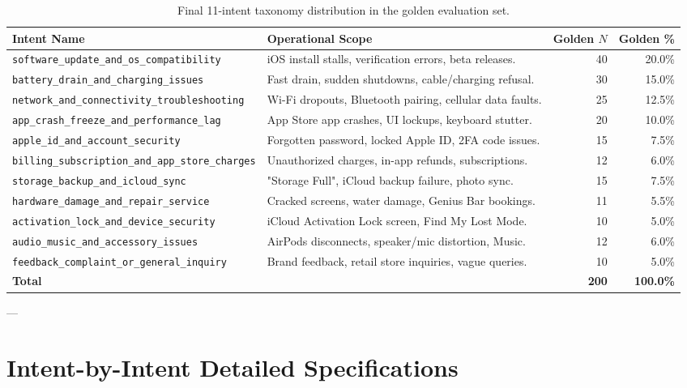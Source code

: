 \documentclass[11pt,a4paper]{article}
\begin{document}
\begin{table}[ht]
\centering
\small
\begin{tabularx}{\textwidth}{lXrr}
\toprule
\textbf{Intent Name} & \textbf{Operational Scope} & \textbf{Golden $N$} & \textbf{Golden \%} \\
\midrule
\texttt{software\_update\_and\_os\_compatibility} & iOS install stalls, verification errors, beta releases. & 40 & 20.0\% \\
\texttt{battery\_drain\_and\_charging\_issues} & Fast drain, sudden shutdowns, cable/charging refusal. & 30 & 15.0\% \\
\texttt{network\_and\_connectivity\_troubleshooting} & Wi-Fi dropouts, Bluetooth pairing, cellular data faults. & 25 & 12.5\% \\
\texttt{app\_crash\_freeze\_and\_performance\_lag} & App Store app crashes, UI lockups, keyboard stutter. & 20 & 10.0\% \\
\texttt{apple\_id\_and\_account\_security} & Forgotten password, locked Apple ID, 2FA code issues. & 15 & 7.5\% \\
\texttt{billing\_subscription\_and\_app\_store\_charges} & Unauthorized charges, in-app refunds, subscriptions. & 12 & 6.0\% \\
\texttt{storage\_backup\_and\_icloud\_sync} & "Storage Full", iCloud backup failure, photo sync. & 15 & 7.5\% \\
\texttt{hardware\_damage\_and\_repair\_service} & Cracked screens, water damage, Genius Bar bookings. & 11 & 5.5\% \\
\texttt{activation\_lock\_and\_device\_security} & iCloud Activation Lock screen, Find My Lost Mode. & 10 & 5.0\% \\
\texttt{audio\_music\_and\_accessory\_issues} & AirPods disconnects, speaker/mic distortion, Music. & 12 & 6.0\% \\
\texttt{feedback\_complaint\_or\_general\_inquiry} & Brand feedback, retail store inquiries, vague queries. & 10 & 5.0\% \\
\midrule
\textbf{Total} & & \textbf{200} & \textbf{100.0\%} \\
\bottomrule
\end{tabularx}
\caption{Final 11-intent taxonomy distribution in the golden evaluation set.}
\label{tab:final_taxonomy}
\end{table}

---

\section{Intent-by-Intent Detailed Specifications}
\end{document}
